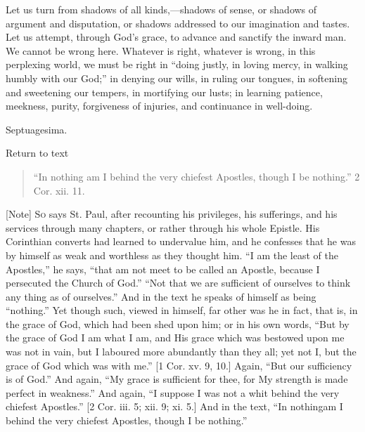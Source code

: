 Let us turn from shadows of all kinds,—shadows of sense, or
shadows of argument and disputation, or shadows addressed to our
imagination and tastes. Let us attempt, through God's grace, to
advance and sanctify the inward man. We cannot be wrong here. Whatever
is right, whatever is wrong, in this perplexing world, we must be
right in ``doing justly, in loving mercy, in walking humbly with
our God;'' in denying our wills, in ruling our tongues, in
softening and sweetening our tempers, in mortifying our lusts; in
learning patience, meekness, purity, forgiveness of injuries, and
continuance in well-doing.


Septuagesima.

Return to text


\begin{quote}

``In nothing am I behind the very chiefest Apostles, though I
be nothing.'' 2 Cor. xii. 11.

\end{quote}

[Note] S\textsc{o} says St. Paul, after recounting his privileges, his sufferings,
and his services through many chapters, or rather through his whole
Epistle. His Corinthian converts had learned to undervalue him, and he
confesses that he was by himself as weak and worthless as they thought
him. ``I am the least of the Apostles,'' he says, ``that
am not meet to be called an Apostle, because I persecuted the Church
of God.'' ``Not that we are sufficient of ourselves to think
any thing as of ourselves.'' And in the text he speaks of himself
as being ``nothing.'' Yet though such, viewed in himself, far
other was he in fact, that is, in the grace of God, which had been
shed upon him; or in his own words, ``But by the grace of God I am
what I am, and His grace which was bestowed upon me was not in vain,
but I laboured more abundantly than they all; yet not I, but the grace
of God which was with me.'' [1 Cor. xv. 9, 10.] Again, ``But
our sufficiency is of God.'' And again, ``My grace is
sufficient for thee, for My strength is made perfect in
weakness.'' And again, ``I suppose I was not a whit behind the
very chiefest Apostles.'' [2 Cor. iii. 5; xii. 9; xi. 5.] And in
the text, ``In nothing\textbf{}am I behind the very chiefest
Apostles, though I be nothing.''

